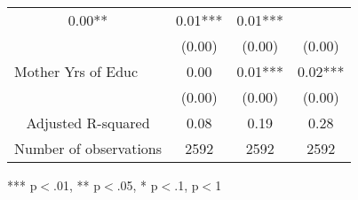 \begin{tabular}{llll}
  \multicolumn{1}{|c}{0.00** } &
  \multicolumn{1}{c}{0.01***} &
  \multicolumn{1}{c}{0.01***} \\
\multicolumn{1}{l}{} &
  \multicolumn{1}{|c}{(0.00)} &
  \multicolumn{1}{c}{(0.00)} &
  \multicolumn{1}{c}{(0.00)} \\
\multicolumn{1}{l}{Mother Yrs of Educ} &
  \multicolumn{1}{|c}{0.00 } &
  \multicolumn{1}{c}{0.01***} &
  \multicolumn{1}{c}{0.02***} \\
\multicolumn{1}{l}{} &
  \multicolumn{1}{|c}{(0.00)} &
  \multicolumn{1}{c}{(0.00)} &
  \multicolumn{1}{c}{(0.00)} \\
\multicolumn{1}{c}{Adjusted R-squared} &
  \multicolumn{1}{|c}{0.08} &
  \multicolumn{1}{c}{0.19} &
  \multicolumn{1}{c}{0.28} \\
\multicolumn{1}{c}{Number of observations} &
  \multicolumn{1}{|c}{2592} &
  \multicolumn{1}{c}{2592} &
  \multicolumn{1}{c}{2592} \\
\cline{1-4}
\end{tabular}

\footnotesize{
*** p$<$.01, ** p$<$.05, * p$<$.1,  p$<$1
}
